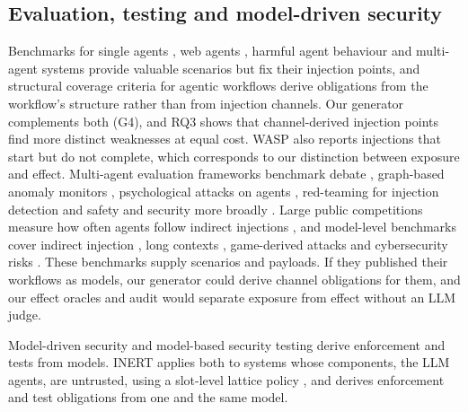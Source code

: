 \documentclass[pdflatex,sn-mathphys-num]{sn-jnl}
\theoremstyle{thmstyleone}%
\theoremstyle{thmstyletwo}%
\theoremstyle{thmstylethree}%
\begin{document}
\subsection{Evaluation, testing and model-driven security}

Benchmarks for single agents \citep{debenedetti2024agentdojo,zhan2024injecagent,zhang2025asb}, web agents \citep{evtimov2025wasp}, harmful agent behaviour \citep{andriushchenko2025agentharm} and multi-agent systems \citep{kavathekar2025tamas,An2026ACIArenaTUH} provide valuable scenarios but fix their injection points, and structural coverage criteria for agentic workflows \citep{kahani2026structural} derive obligations from the workflow's structure rather than from injection channels. Our generator complements both (G4), and RQ3 shows that channel-derived injection points find more distinct weaknesses at equal cost. WASP \citep{evtimov2025wasp} also reports injections that start but do not complete, which corresponds to our distinction between exposure and effect. Multi-agent evaluation frameworks benchmark debate \citep{Liu2026MADBenchBTU}, graph-based anomaly monitors \citep{MateoTorrejon2026GAMMAFACAG}, psychological attacks on agents \citep{Zhang2024PsySafeACAN}, red-teaming for injection detection \citep{Ogunjinmi2026AgenticARN} and safety and security more broadly \citep{Hagag2026ORBITAFAD,Sharma2025TowardsUQBD}. Large public competitions measure how often agents follow indirect injections \citep{Dziemian2026HowVAAN,Zou2025SecurityCIAD}, and model-level benchmarks cover indirect injection \citep{Yi2023BenchmarkingADAR}, long contexts \citep{Liu2026LongPIBenchALAV}, game-derived attacks \citep{Toyer2023TensorTIAM} and cybersecurity risks \citep{Wan2024CYBERSECEVAL3ABJ}. These benchmarks supply scenarios and payloads. If they published their workflows as models, our generator could derive channel obligations for them, and our effect oracles and audit would separate exposure from effect without an LLM judge.

Model-driven security \citep{lodderstedt2002secureuml,jurjens2002umlsec,basin2006mds} and model-based security testing \citep{utting2012taxonomy,felderer2016mbst} derive enforcement and tests from models. INERT applies both to systems whose components, the LLM agents, are untrusted, using a slot-level lattice policy \citep{denning1976lattice,sabelfeld2003language}, and derives enforcement and test obligations from one and the same model.

\end{document}

